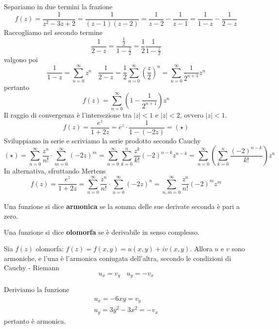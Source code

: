 Separiamo in due termini la frazione
\begin{equation*}
f(z) = \frac{1}{z^{2} - 3z + 2} = \frac{1}{(z - 1)(z - 2)} = \frac{1}{z - 2} - \frac{1}{z - 1} = \frac{1}{1 - z} - \frac{1}{2 - z}
\end{equation*}
Raccogliamo nel secondo termine
\begin{equation*}
\frac{1}{2 - z} = \frac{\frac{1}{2}}{1 - \frac{z}{2}} = \frac{1}{2}\frac{1}{1 - \frac{z}{2}}
\end{equation*}
valgono poi
\begin{equation*}
\frac{1}{1 - z} = \sum^{\infty}_{n = 0} z^{n} \ \ \ \ \frac{1}{2 - z} = \frac{1}{2}\sum^{\infty}_{n = 0}\left(\frac{z}{2}\right)^{n} = \sum^{\infty}_{n = 0}\frac{1}{2^{n + 1}} z^{n}
\end{equation*}
pertanto
\begin{equation*}
f(z) = \sum^{\infty}_{n = 0}\left(1 - \frac{1}{2^{n + 1}}\right) z^{n}
\end{equation*}
Il raggio di convergenza è l'intersezione tra $|z| < 1$ e $|z| < 2$, ovvero $|z| < 1$.
\Soluzione
\begin{equation*}
f(z) = \frac{e^{z}}{1 + 2z} = e^{z} \cdot \frac{1}{1 - (- 2z)} = (\star)
\end{equation*}
Sviluppiamo in serie e scriviamo la serie prodotto secondo Cauchy
\begin{equation*}
(\star) = \sum^{\infty}_{n = 0}\frac{z^{n}}{n!} \cdot \sum^{\infty}_{m = 0} (- 2z)^{m} = \sum^{\infty}_{n = 0}\sum^{n}_{k = 0}\frac{z^{k}}{k!} (- 2)^{n - k} z^{n - k} = \sum^{\infty}_{n = 0}\left(\sum^{n}_{k = 0}\frac{(- 2)^{n - k}}{k!}\right) z^{n}
\end{equation*}
In alternativa, sfruttando Mertens
\begin{equation*}
f(z) = \frac{e^{z}}{1 + 2z} = \sum^{\infty}_{n = 0}\frac{z^{n}}{n!} \cdot \sum^{\infty}_{n = 0} (- 2z)^{n} = \sum^{\infty}_{n, m = 0}\frac{z^{n}}{n!} (- 2)^{m} z^{m}
\end{equation*}
\Soluzione
\begin{defn}
Una funzione si dice \textbf{armonica} se la somma delle sue derivate seconda è pari a zero.
\end{defn}
\begin{defn}
Una funzione si dice \textbf{olomorfa} se è derivabile in senso complesso.
\end{defn}
\begin{thm}
Sia $f(z)$ olomorfa: $f(z) = f(x, y) = u(x, y) + iv(x, y)$. Allora $u$ e $v$ sono armoniche, e l'una è l'armonica coniugata dell'altra, secondo le condizioni di Cauchy - Riemann
\begin{equation*}
u_{x} = v_{y} \ \ \ \ u_{y} = - v_{x}
\end{equation*}
\end{thm}
Deriviamo la funzione
\begin{gather*}
u_{x} = - 6xy = v_{y}\\
u_{y} = 3y^{2} - 3x^{2} = - v_{x}
\end{gather*}
pertanto è armonica.

